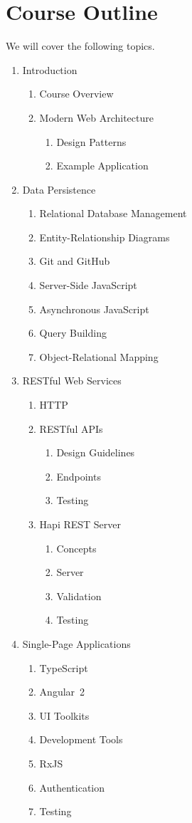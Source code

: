 \documentclass[11pt]{article}
\begin{document}
\section{Course Outline}

We will cover the following topics.
\begin{enumerate}
\item Introduction
  \begin{enumerate}
  \item Course Overview
  \item Modern Web Architecture
    \begin{enumerate}
    \item Design Patterns
    \item Example Application
    \end{enumerate}
  \end{enumerate}
\item Data Persistence
  \begin{enumerate}
  \item Relational Database Management
  \item Entity-Relationship Diagrams
  \item Git and GitHub
  \item Server-Side JavaScript
  \item Asynchronous JavaScript
  \item Query Building
  \item Object-Relational Mapping
  \end{enumerate}
\item RESTful Web Services
  \begin{enumerate}
  \item HTTP
  \item RESTful APIs
    \begin{enumerate}
    \item Design Guidelines
    \item Endpoints
    \item Testing
    \end{enumerate}
  \item Hapi REST Server
    \begin{enumerate}
    \item Concepts
    \item Server
    \item Validation
    \item Testing
    \end{enumerate}
  \end{enumerate}
\item Single-Page Applications
  \begin{enumerate}
  \item TypeScript
  \item Angular~2
  \item UI Toolkits
  \item Development Tools
  \item RxJS
  \item Authentication
  \item Testing
  \end{enumerate}
\end{enumerate}
\end{document}
